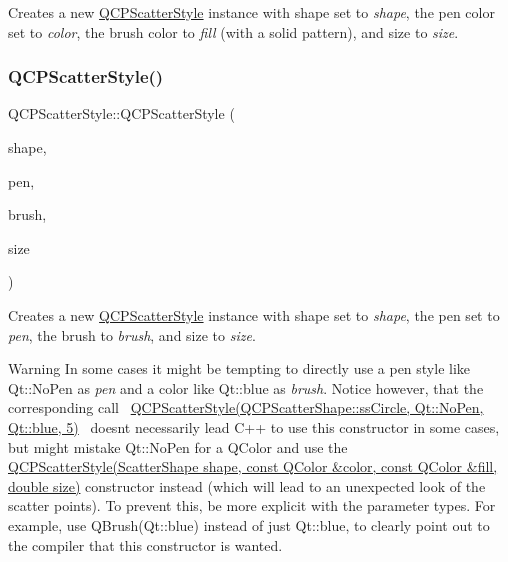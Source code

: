 Creates a new \hyperlink{classQCPScatterStyle}{Q\+C\+P\+Scatter\+Style} instance with shape set to {\itshape shape}, the pen color set to {\itshape color}, the brush color to {\itshape fill} (with a solid pattern), and size to {\itshape size}. \mbox{\label{classQCPScatterStyle_a85acc4941d7e5c9bca5fa51377a77f49}} 
\subsubsection{\texorpdfstring{Q\+C\+P\+Scatter\+Style()}{QCPScatterStyle()}\hspace{0.1cm}{\footnotesize\ttfamily [5/7]}}
{\footnotesize\ttfamily Q\+C\+P\+Scatter\+Style\+::\+Q\+C\+P\+Scatter\+Style (\begin{DoxyParamCaption}\item[{\hyperlink{classQCPScatterStyle_adb31525af6b680e6f1b7472e43859349}{Scatter\+Shape}}]{shape,  }\item[{const Q\+Pen \&}]{pen,  }\item[{const Q\+Brush \&}]{brush,  }\item[{double}]{size }\end{DoxyParamCaption})}

Creates a new \hyperlink{classQCPScatterStyle}{Q\+C\+P\+Scatter\+Style} instance with shape set to {\itshape shape}, the pen set to {\itshape pen}, the brush to {\itshape brush}, and size to {\itshape size}.

\begin{DoxyWarning}{Warning}
In some cases it might be tempting to directly use a pen style like {\ttfamily Qt\+::\+No\+Pen} as {\itshape pen} and a color like {\ttfamily Qt\+::blue} as {\itshape brush}. Notice however, that the corresponding call~\newline
{\ttfamily \hyperlink{classQCPScatterStyle}{Q\+C\+P\+Scatter\+Style(\+Q\+C\+P\+Scatter\+Shape\+::ss\+Circle, Qt\+::\+No\+Pen, Qt\+::blue, 5)}}~\newline
doesn\textquotesingle{}t necessarily lead C++ to use this constructor in some cases, but might mistake {\ttfamily Qt\+::\+No\+Pen} for a Q\+Color and use the \hyperlink{classQCPScatterStyle_a6e1b64f12cac7f07af180ae4316fd38d}{Q\+C\+P\+Scatter\+Style(\+Scatter\+Shape shape, const Q\+Color \&color, const Q\+Color \&fill, double size)} constructor instead (which will lead to an unexpected look of the scatter points). To prevent this, be more explicit with the parameter types. For example, use {\ttfamily Q\+Brush(\+Qt\+::blue)} instead of just {\ttfamily Qt\+::blue}, to clearly point out to the compiler that this constructor is wanted. 
\end{DoxyWarning}
\mbox{\label{classQCPScatterStyle_a63962094587a4c2258435aa7933996cc}} 

